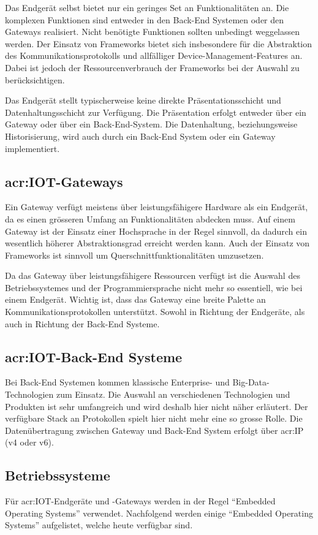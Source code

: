 Das Endgerät selbst bietet nur ein geringes Set an Funktionalitäten an. Die komplexen Funktionen sind entweder in den Back-End Systemen oder den Gateways realisiert. Nicht benötigte Funktionen sollten unbedingt weggelassen werden. Der Einsatz von Frameworks bietet sich insbesondere für die Abstraktion des Kommunikationsprotokolls und allfälliger Device-Management-Features an. Dabei ist jedoch der Ressourcenverbrauch der Frameworks bei der Auswahl zu berücksichtigen.

Das Endgerät stellt typischerweise keine direkte Präsentationsschicht und Datenhaltungsschicht zur Verfügung. Die Präsentation erfolgt entweder über ein Gateway oder über ein Back-End-System. Die Datenhaltung, beziehungsweise Historisierung, wird auch durch ein Back-End System oder ein Gateway implementiert. 


\subsection{\gls{acr:IOT}-Gateways}
Ein Gateway verfügt meistens über leistungsfähigere Hardware als ein Endgerät, da es einen grösseren Umfang an Funktionalitäten abdecken muss. Auf einem Gateway ist der Einsatz einer Hochsprache in der Regel sinnvoll, da dadurch ein wesentlich höherer Abstraktionsgrad erreicht werden kann. Auch der Einsatz von Frameworks ist sinnvoll um Querschnittfunktionalitäten umzusetzen.


Da das Gateway über leistungsfähigere Ressourcen verfügt ist die Auswahl des Betriebssystemes und der Programmiersprache nicht mehr so essentiell, wie bei einem Endgerät. Wichtig ist, dass das Gateway eine breite Palette an Kommunikationsprotokollen unterstützt. Sowohl in Richtung der Endgeräte, als auch in Richtung der Back-End Systeme.


\subsection{\gls{acr:IOT}-Back-End Systeme}
Bei Back-End Systemen kommen klassische Enterprise- und Big-Data-Technologien zum Einsatz. Die Auswahl an verschiedenen Technologien und Produkten ist sehr umfangreich und wird deshalb hier nicht näher erläutert. Der verfügbare Stack an Protokollen spielt hier nicht mehr eine so grosse Rolle. Die Datenübertragung zwischen Gateway und Back-End System erfolgt über \gls{acr:IP} (v4 oder v6).



\subsection{Betriebssysteme}
Für \gls{acr:IOT}-Endgeräte und -Gateways werden in der Regel "`Embedded Operating Systems"' verwendet. Nachfolgend werden einige "`Embedded Operating Systems"' aufgelistet, welche heute verfügbar sind.

